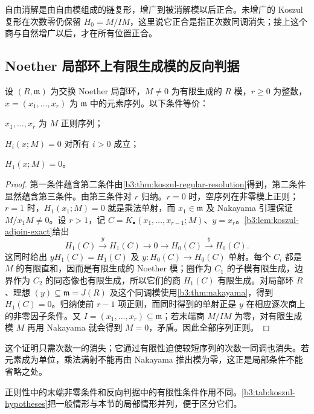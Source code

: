 自由消解是由自由模组成的链复形，增广到被消解模以后正合。未增广的 Koszul 复形在次数零仍保留 \(H_0=M/IM\)，这里说它正合是指正次数同调消失；接上这个商与自然增广以后，才在所有位置正合。

\subsection{Noether 局部环上有限生成模的反向判据}
\label{b3:subsec:1503:02}

\begin{theorem}\label{b3:thm:koszul-acyclic}
	设 \((R,\mathfrak m)\) 为交换 Noether 局部环，\(M\ne0\) 为有限生成的 \(R\) 模，\(r\ge0\) 为整数，\(x=(x_1,\ldots,x_r)\) 为 \(\mathfrak m\) 中的元素序列。以下条件等价：
	\begin{equivalences}
		\item \(x_1,\ldots,x_r\) 为 \(M\) 正则序列；
		\item \(H_i(x;M)=0\) 对所有 \(i>0\) 成立；
		\item \(H_1(x;M)=0\)。
	\end{equivalences}
\end{theorem}
\begin{proof}
	第一条件蕴含第二条件由\cref{b3:thm:koszul-regular-resolution}得到，第二条件显然蕴含第三条件。由第三条件对 \(r\) 归纳。\(r=0\) 时，空序列在非零模上正则；\(r=1\) 时，\(H_1(x_1;M)=0\) 就是乘法单射，而 \(x_1\in\mathfrak m\) 及 Nakayama 引理保证 \(M/x_1M\ne0\)。设 \(r>1\)，记 \(C=K_\bullet(x_1,\ldots,x_{r-1};M)\)、\(y=x_r\)。\cref{b3:lem:koszul-adjoin-exact}给出
	\[
		H_1(C)\xrightarrow{y}H_1(C)\longrightarrow0 \longrightarrow H_0(C)\xrightarrow{y}H_0(C).
	\]
	这同时给出 \(yH_1(C)=H_1(C)\) 及 \(y:H_0(C)\to H_0(C)\) 单射。每个 \(C_i\) 都是 \(M\) 的有限直和，因而是有限生成的 Noether 模；圈作为 \(C_1\) 的子模有限生成，边界作为 \(C_2\) 的同态像也有限生成，所以它们的商 \(H_1(C)\) 有限生成。对局部环 \(R\)、理想 \((y)\subseteq\mathfrak m=J(R)\) 及这个同调模使用\cref{b3:thm:nakayama}，得到 \(H_1(C)=0\)。归纳使前 \(r-1\) 项正则，而同时得到的单射正是 \(y\) 在相应逐次商上的非零因子条件。又 \(I=(x_1,\ldots,x_r)\subseteq\mathfrak m\)；若末端商 \(M/IM\) 为零，对有限生成模 \(M\) 再用 Nakayama 就会得到 \(M=0\)，矛盾。因此全部序列正则。
\end{proof}

这个证明只需次数一的消失；它通过有限性迫使较短序列的次数一同调也消失。若元素成为单位，乘法满射不能再由 Nakayama 推出模为零，这正是局部条件不能省略之处。

\ProseParagraphBreak
正则性中的末端非零条件和反向判据中的有限性条件作用不同。\cref{b3:tab:koszul-hypotheses}把一般情形与本节的局部情形并列，便于区分它们。

